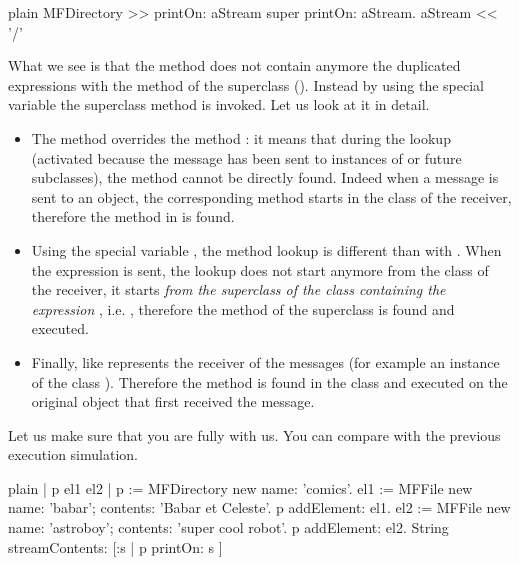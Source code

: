 \documentclass[10pt,twoside,english]{_support/latex/sbabook/sbabook}
\begin{document}
\begin{displaycode}{plain}
MFDirectory >> printOn: aStream
	super printOn: aStream.
	aStream << '/'
\end{displaycode}

What we see is that the method  does not contain anymore the duplicated expressions with the method  of the superclass (). Instead by using the special variable  the superclass method is invoked. Let us look at it in detail.

\begin{itemize}
\item The method  overrides the method : it means that during the lookup (activated because the message  has been sent to instances of  or future subclasses), the method  cannot be directly found. Indeed when a message is sent to an object, the corresponding method starts in the class of the receiver, therefore the method in  is found.
\end{itemize}

\begin{itemize}
\item Using the special variable , the method lookup is different than with . When the expression  is sent, the lookup does not start anymore from the class of the receiver, it starts \textit{from the superclass of the class containing the expression} , i.e. , therefore the method of the superclass is found and executed. 
\end{itemize}

\begin{itemize}
\item Finally,  like  represents the receiver of the messages (for example an instance of the class ). Therefore the method is found in the class  and executed on the original object that first received the message.
\end{itemize}

Let us make sure that you are fully with us. You can compare with the previous execution simulation.

\begin{displaycode}{plain}
| p el1 el2 |
p := MFDirectory new name: 'comics'.
el1 := MFFile new name: 'babar'; contents: 'Babar et Celeste'.
p addElement: el1.
el2 := MFFile new name: 'astroboy'; contents: 'super cool robot'.
p addElement: el2.
String streamContents: [:s | p printOn: s ]
\end{displaycode}
\end{document}
